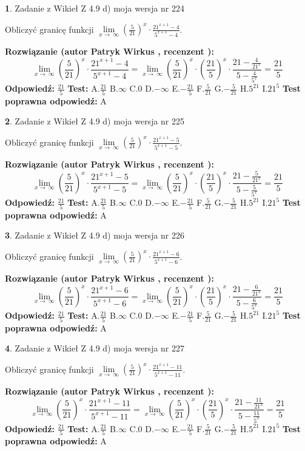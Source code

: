 \documentclass[12pt, a4paper]{article}
\theoremstyle{definition} %
\newtheorem{zad}{}
\newcommand{\zadStart}[1]{\begin{zad}#1\newline}
\newcommand{\zadStop}{\end{zad}}
\newcommand{\rozwStart}[2]{\noindent \textbf{Rozwiązanie (autor #1 , recenzent #2): }\newline}
\newcommand{\rozwStop}{\newline}
\newcommand{\odpStart}{\noindent \textbf{Odpowiedź:}\newline}
\newcommand{\odpStop}{\newline}
\newcommand{\testStart}{\noindent \textbf{Test:}\newline}
\newcommand{\testStop}{\newline}
\newcommand{\kluczStart}{\noindent \textbf{Test poprawna odpowiedź:}\newline}
\newcommand{\kluczStop}{\newline}
\begin{document}
\zadStart{Zadanie z Wikieł Z 4.9 d) moja wersja nr 224}


Obliczyć granicę funkcji  $\lim\limits_{x\to\ \infty}(\frac{5}{21})^{x}\cdot\frac{21^{x+1}-4}{5^{x+1}-4}$.
\zadStop
\rozwStart{Patryk Wirkus}{}
$$\lim\limits_{x\to\ \infty}(\frac{5}{21})^{x}\cdot\frac{21^{x+1}-4}{5^{x+1}-4}=\lim\limits_{x\to\ \infty}(\frac{5}{21})^{x}\cdot(\frac{21}{5})^{x} \cdot \frac{21-\frac{4}{21^{x}}}{5-\frac{4}{5^{x}}} = \frac{21}{5}$$
\rozwStop
\odpStart
$\frac{21}{5}$
\odpStop
\testStart
A.$\frac{21}{5}$ B.$\infty$ C.$0$ D.$-\infty$ E.$-\frac{21}{5}$
F.$\frac{5}{21}$ G.$-\frac{5}{21}$
H.$5^{21}$
I.$21^{5}$
\testStop
\kluczStart
A
\kluczStop



\zadStart{Zadanie z Wikieł Z 4.9 d) moja wersja nr 225}


Obliczyć granicę funkcji  $\lim\limits_{x\to\ \infty}(\frac{5}{21})^{x}\cdot\frac{21^{x+1}-5}{5^{x+1}-5}$.
\zadStop
\rozwStart{Patryk Wirkus}{}
$$\lim\limits_{x\to\ \infty}(\frac{5}{21})^{x}\cdot\frac{21^{x+1}-5}{5^{x+1}-5}=\lim\limits_{x\to\ \infty}(\frac{5}{21})^{x}\cdot(\frac{21}{5})^{x} \cdot \frac{21-\frac{5}{21^{x}}}{5-\frac{5}{5^{x}}} = \frac{21}{5}$$
\rozwStop
\odpStart
$\frac{21}{5}$
\odpStop
\testStart
A.$\frac{21}{5}$ B.$\infty$ C.$0$ D.$-\infty$ E.$-\frac{21}{5}$
F.$\frac{5}{21}$ G.$-\frac{5}{21}$
H.$5^{21}$
I.$21^{5}$
\testStop
\kluczStart
A
\kluczStop



\zadStart{Zadanie z Wikieł Z 4.9 d) moja wersja nr 226}


Obliczyć granicę funkcji  $\lim\limits_{x\to\ \infty}(\frac{5}{21})^{x}\cdot\frac{21^{x+1}-6}{5^{x+1}-6}$.
\zadStop
\rozwStart{Patryk Wirkus}{}
$$\lim\limits_{x\to\ \infty}(\frac{5}{21})^{x}\cdot\frac{21^{x+1}-6}{5^{x+1}-6}=\lim\limits_{x\to\ \infty}(\frac{5}{21})^{x}\cdot(\frac{21}{5})^{x} \cdot \frac{21-\frac{6}{21^{x}}}{5-\frac{6}{5^{x}}} = \frac{21}{5}$$
\rozwStop
\odpStart
$\frac{21}{5}$
\odpStop
\testStart
A.$\frac{21}{5}$ B.$\infty$ C.$0$ D.$-\infty$ E.$-\frac{21}{5}$
F.$\frac{5}{21}$ G.$-\frac{5}{21}$
H.$5^{21}$
I.$21^{5}$
\testStop
\kluczStart
A
\kluczStop



\zadStart{Zadanie z Wikieł Z 4.9 d) moja wersja nr 227}


Obliczyć granicę funkcji  $\lim\limits_{x\to\ \infty}(\frac{5}{21})^{x}\cdot\frac{21^{x+1}-11}{5^{x+1}-11}$.
\zadStop
\rozwStart{Patryk Wirkus}{}
$$\lim\limits_{x\to\ \infty}(\frac{5}{21})^{x}\cdot\frac{21^{x+1}-11}{5^{x+1}-11}=\lim\limits_{x\to\ \infty}(\frac{5}{21})^{x}\cdot(\frac{21}{5})^{x} \cdot \frac{21-\frac{11}{21^{x}}}{5-\frac{11}{5^{x}}} = \frac{21}{5}$$
\rozwStop
\odpStart
$\frac{21}{5}$
\odpStop
\testStart
A.$\frac{21}{5}$ B.$\infty$ C.$0$ D.$-\infty$ E.$-\frac{21}{5}$
F.$\frac{5}{21}$ G.$-\frac{5}{21}$
H.$5^{21}$
I.$21^{5}$
\testStop
\kluczStart
A
\kluczStop
\end{document}
